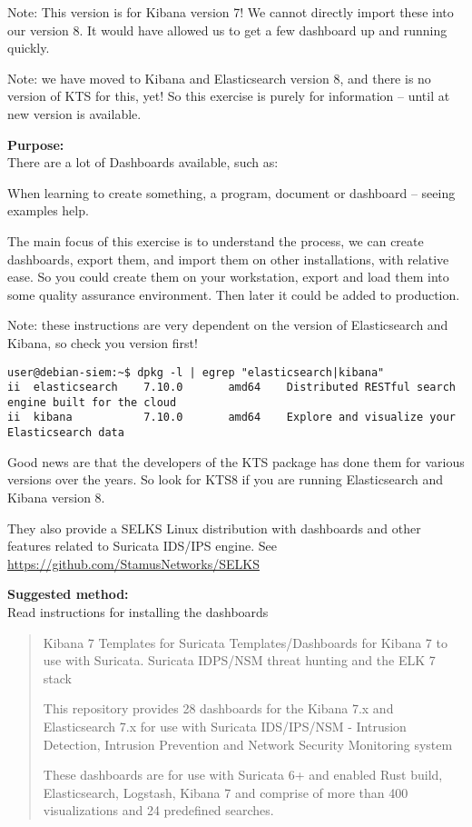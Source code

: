 \documentclass[a4paper,11pt,notitlepage]{report}
\begin{document}
Note: This version is for Kibana version 7! We cannot directly import these into our version 8. It would have allowed us to get a few dashboard up and running quickly.

Note: we have moved to Kibana and Elasticsearch version 8, and there is no version of KTS for this, yet! So this exercise is purely for information -- until at new version is available.

{\bf Purpose:}\\
There are a lot of Dashboards available, such as:\\

When learning to create something, a program, document or dashboard -- seeing examples help.

The main focus of this exercise is to understand the process, we can create dashboards, export them, and import them on other installations, with relative ease. So you could create them on your workstation, export and load them into some quality assurance environment. Then later it could be added to production.

Note: these instructions are very dependent on the version of Elasticsearch and Kibana, so check you version first!
\begin{verbatim}
user@debian-siem:~$ dpkg -l | egrep "elasticsearch|kibana"
ii  elasticsearch    7.10.0       amd64    Distributed RESTful search engine built for the cloud
ii  kibana           7.10.0       amd64    Explore and visualize your Elasticsearch data
\end{verbatim}

Good news are that the developers of the KTS package has done them for various versions over the years. So look for KTS8 if you are running Elasticsearch and Kibana version 8.

They also provide a SELKS Linux distribution with dashboards and other features related to Suricata IDS/IPS engine. See \url{https://github.com/StamusNetworks/SELKS}

{\bf Suggested method:}\\
Read instructions for installing the dashboards\\

\begin{quote}
Kibana 7 Templates for Suricata
Templates/Dashboards for Kibana 7 to use with Suricata. Suricata IDPS/NSM threat hunting and the ELK 7 stack

This repository provides 28 dashboards for the Kibana 7.x and Elasticsearch 7.x for use with Suricata IDS/IPS/NSM - Intrusion Detection, Intrusion Prevention and Network Security Monitoring system

These dashboards are for use with Suricata 6+ and enabled Rust build, Elasticsearch, Logstash, Kibana 7 and comprise of more than 400 visualizations and 24 predefined searches.
\end{quote}
\end{document}
